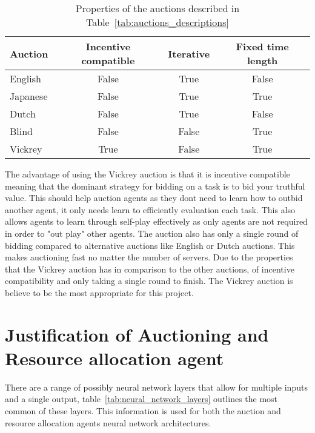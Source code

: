 \begin{table}[h]
    \centering
    \begin{tabular}{|l|c|c|c|} \hline
        Auction  & Incentive compatible & Iterative & Fixed time length\\ \hline
        English  & False                & True      & False            \\ \hline
        Japanese & False                & True      & True             \\ \hline
        Dutch    & False                & True      & False            \\ \hline
        Blind    & False                & False     & True             \\ \hline
        Vickrey  & True                 & False     & True             \\ \hline
    \end{tabular}
    \caption{Properties of the auctions described in Table~\ref{tab:auctions_descriptions}}
    \label{tab:auction_properties}
\end{table}

The advantage of using the Vickrey auction is that it is incentive compatible meaning that the dominant strategy for
bidding on a task is to bid your truthful value. This should help auction agents as they dont need to learn how to
outbid another agent, it only needs learn to efficiently evaluation each task. This also allows agents to learn through
self-play effectively as only agents are not required in order to "out play" other agents. The auction also has only a
single round of bidding compared to alternative auctions like English or Dutch auctions. This makes auctioning fast
no matter the number of servers. Due to the properties that the Vickrey auction has in comparison to the other auctions,
of incentive compatibility and only taking a single round to finish. The Vickrey auction is believe to be the most
appropriate for this project.

\section{Justification of Auctioning and Resource allocation agent}\label{sec:justification-of-auctioning-and-resource-allocation-agent}
There are a range of possibly neural network layers that allow for multiple inputs and a single output,
table~\ref{tab:neural_network_layers} outlines the most common of these layers. This information is used for both the
auction and resource allocation agents neural network architectures.


